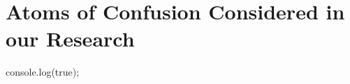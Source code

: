 \section{Atoms of Confusion Considered in our Research}\label{sec:appendix-atoms} 


  console.log(true);


